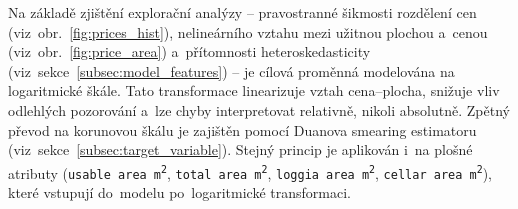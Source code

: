 Na základě zjištění explorační analýzy -- pravostranné šikmosti rozdělení cen (viz~obr.~\ref{fig:prices_hist}), nelineárního vztahu mezi užitnou plochou a~cenou (viz~obr.~\ref{fig:price_area}) a~přítomnosti heteroskedasticity (viz~sekce~\ref{subsec:model_features}) -- je cílová proměnná modelována na logaritmické škále. Tato transformace linearizuje vztah cena–plocha, snižuje vliv odlehlých pozorování a~lze chyby interpretovat relativně, nikoli absolutně. Zpětný převod na korunovou škálu je zajištěn pomocí Duanova smearing estimatoru (viz~sekce~\ref{subsec:target_variable}). Stejný princip je aplikován i~na plošné atributy (\texttt{usable area m\textsuperscript{2}}, \texttt{total area m\textsuperscript{2}}, \texttt{loggia area m\textsuperscript{2}}, \texttt{cellar area m\textsuperscript{2}}), které vstupují do~modelu po~logaritmické transformaci.


